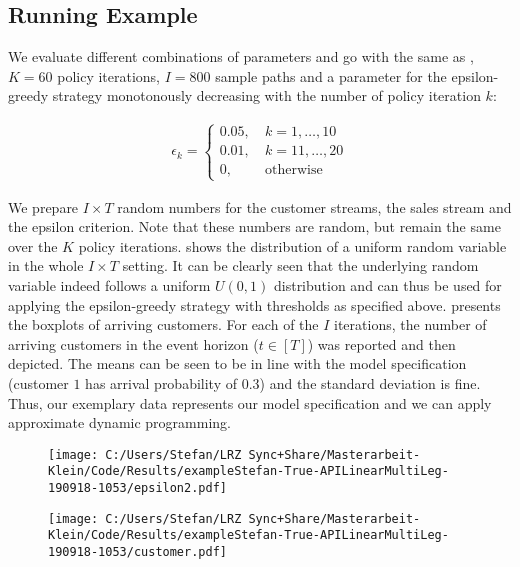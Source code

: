 \subsection{Running Example}


We evaluate different combinations of parameters and go with the same as \cite{Koch.2017}, \ie $K = 60$ policy iterations, $I = 800$ sample paths and a parameter for the epsilon-greedy strategy monotonously decreasing with the number of policy iteration $k$:

\begin{align}
\epsilon_k = 
\begin{cases}
0.05, ~ &k=1, \dots, 10\\
0.01, ~ &k=11, \dots, 20\\
0, & \text{otherwise}
\end{cases}
\end{align}

We prepare $I \times T$ random numbers for the customer streams, the sales stream and the epsilon criterion. Note that these numbers are random, but remain the same over the $K$ policy iterations.  shows the distribution of a uniform random variable in the whole $I \times T$ setting. It can be clearly seen that the underlying random variable indeed follows a uniform $U(0,1)$ distribution and can thus be used for applying the epsilon-greedy strategy with thresholds as specified above.  presents the boxplots of arriving customers. For each of the $I$ iterations, the number of arriving customers in the event horizon ($t \in [T]$) was reported and then depicted. The means can be seen to be in line with the model specification (\eg customer $1$ has arrival probability of $0.3$) and the standard deviation is fine. Thus, our exemplary data represents our model specification and we can apply approximate dynamic programming.

\begin{figure}[H]
	\begin{minipage}[t][7cm][t]{.5\textwidth}
		\centering
		\texttt{[image: C:/Users/Stefan/LRZ Sync+Share/Masterarbeit-Klein/Code/Results/exampleStefan-True-APILinearMultiLeg-190918-1053/epsilon2.pdf]}
	\end{minipage}%
	\begin{minipage}[t][7cm][t]{.5\textwidth}
		\centering
		\texttt{[image: C:/Users/Stefan/LRZ Sync+Share/Masterarbeit-Klein/Code/Results/exampleStefan-True-APILinearMultiLeg-190918-1053/customer.pdf]}
	\end{minipage}
\end{figure}

